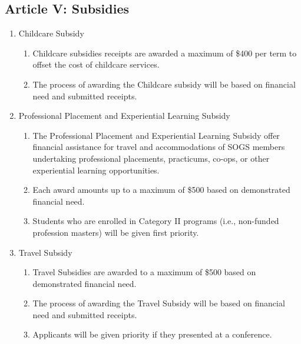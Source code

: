 \subsection{Article V: Subsidies}
\begin{enumerate}[label*=\arabic*., align=left]	
\item Childcare Subsidy
\begin{enumerate}[label*=\arabic*., align=left]	
\item Childcare subsidies receipts are awarded a maximum of \$400 per term to offset the cost of childcare services.
\item The process of awarding the Childcare subsidy will be based on financial need and submitted receipts.
\end{enumerate}
\item Professional Placement and Experiential Learning Subsidy
\begin{enumerate}[label*=\arabic*., align=left]	
\item The Professional Placement and Experiential Learning Subsidy offer financial assistance for travel and accommodations of SOGS members undertaking professional placements, practicums, co-ops, or other experiential learning opportunities. 
\item Each award amounts up to a maximum of \$500 based on demonstrated financial need.
\item Students who are enrolled in Category II programs (i.e., non-funded profession masters) will be given first priority.
\end{enumerate}
\item Travel Subsidy
\begin{enumerate}[label*=\arabic*., align=left]	
\item Travel Subsidies are awarded to a maximum of \$500 based on demonstrated financial need.
\item The process of awarding the Travel Subsidy will be based on financial need and submitted receipts.
\item Applicants will be given priority if they presented at a conference.
\end{enumerate}
\end{enumerate}